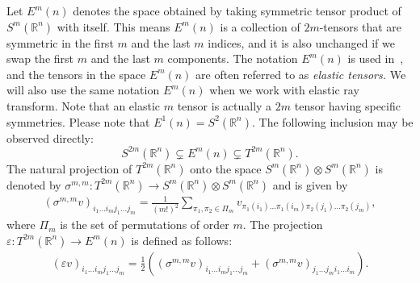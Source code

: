 \documentclass[11pt]{article}
\newcommand{\Rb}{\mathbb{R}}
\newcommand{\FR}{\mathbb{R}} %
\begin{document}
Let $E^m(n)$ denotes the space obtained by taking symmetric tensor product of $\mathit{S}^m(\mathbb{R}^n)$ with itself. This means $E^m(n)$ is a collection of $2m$-tensors that are symmetric in the first $m$ and the last $m$ indices, and it is also unchanged if we swap the first $m$ and the last $m$ components.
The notation $E^m(n)$ is used in~\cite{ilmavirta2025elasticraytransform}, and the tensors in the space $E^m(n)$ are often referred to as \textit{elastic tensors.} We will also use the same notation $E^m(n)$ when we work with elastic ray transform. Note that an elastic $m$ tensor is actually a $2m$ tensor having specific symmetries. Please note that $\mathit{E}^{1}(n) = S^2(\mathbb{R}^n)$. The following inclusion may be observed directly:
$$ S^{2m}(\mathbb{R}^n) \subsetneq E^{m}(n)  \subsetneq T^{2m}(\mathbb{R}^n).$$
The natural projection of $T^{2m}(\Rb^n)$ onto the space $S^m(\Rb^n)\otimes S^m(\Rb^n)$ is denoted by $\sigma^{m,m} : T^{2m}(\Rb^n) \rightarrow S^m(\Rb^n)\otimes  S^m(\Rb^n)$ and is given by  
\begin{align}\label{eq:definition of sigma(k,l)}
(\sigma^{m,m} v)_{i_1\dots i_mj_1\dots j_m} = \frac{1}{(m!)^2}\sum_{\pi_1, \pi_2 \in \Pi_m}  v_{\pi_1(i_1)\dots \pi_1(i_m)\pi_2(j_1)\dots \pi_2(j_m)},
\end{align}
where $\Pi_m$ is the set of permutations of order $m$. The projection $\varepsilon : T^{2m}(\Rb^n) \rightarrow E^m(n)$ is defined as follows:
\begin{align}\label{eq:definition of epsilon}
    (\varepsilon v)_{i_1\dots i_mj_1\dots j_m} = \frac{1}{2}\left((\sigma^{m,m} v)_{i_1\dots i_mj_1\dots j_m} +(\sigma^{m,m} v)_{j_1\dots j_m i_1\dots i_m}\right).
\end{align}
\end{document}
